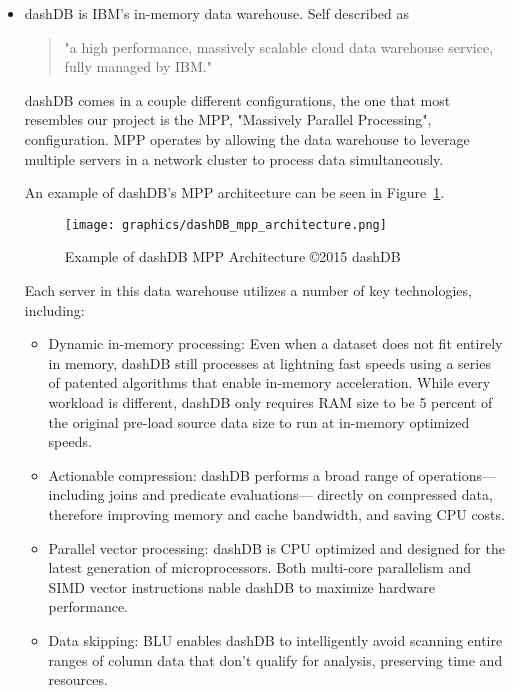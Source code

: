 \documentclass[letterpaper, 11pt]{article}
\begin{document}
\begin{itemize}
  \item dashDB is IBM's in-memory data warehouse. Self described as
  \begin{quote}
  "a high performance, massively scalable cloud data warehouse service,
  fully managed by IBM." \cite{dashDB}
  \end{quote}
  dashDB comes in a couple different configurations, the one that most resembles
  our project is the MPP, "Massively Parallel Processing", configuration.
  MPP operates by allowing the data warehouse to leverage multiple servers
  in a network cluster to process data simultaneously.
  \par\vspace{\baselineskip}
  An example of dashDB's MPP architecture can be seen in Figure~\ref{fig:dashdb_mpp}.
  \begin{figure}[H]
    \centering
    \texttt{[image: graphics/dashDB\_mpp\_architecture.png]}
    \caption{Example of dashDB MPP Architecture \copyright 2015 dashDB \cite{dashDB}}
    \label{fig:dashdb_mpp}
  \end{figure}
  \par\vspace{\baselineskip}
  Each server in this data warehouse utilizes a number of key technologies, including:
  \begin{itemize}
    \item Dynamic in-memory processing: Even when a dataset
    does not fit entirely in memory, dashDB still processes at
    lightning fast speeds using a series of patented algorithms
    that enable in-memory acceleration. While every workload
    is different, dashDB only requires RAM size to be 5 percent
    of the original pre-load source data size to run at
in-memory optimized speeds.
\item Actionable compression: dashDB performs a broad range
    of operations—including joins and predicate evaluations—
    directly on compressed data, therefore improving memory
    and cache bandwidth, and saving CPU costs.
   \item Parallel vector processing: dashDB is CPU optimized
   and designed for the latest generation of microprocessors.
   Both multi-core parallelism and SIMD vector instructions
nable dashDB to maximize hardware performance.
   \item Data skipping: BLU enables dashDB to intelligently avoid
   scanning entire ranges of column data that don’t qualify for
   analysis, preserving time and resources.
 \end{itemize}


\end{itemize}
\end{document}
